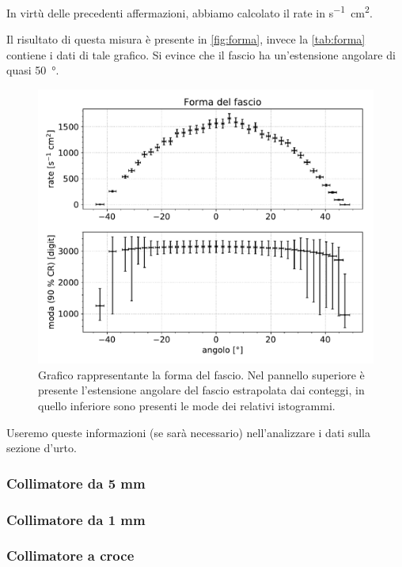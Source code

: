 
In virtù delle precedenti affermazioni, abbiamo calcolato il rate in \si{s^{-1}cm^2}.



Il risultato di questa misura è presente in \autoref{fig:forma}, invece la \autoref{tab:forma} contiene i dati di tale grafico.
Si evince che il fascio ha un'estensione angolare di quasi \SI{50}{\degree}. 

\begin{figure}[h]
\centering
\includegraphics[width=30 em]{immagini/forma}
\caption{Grafico rappresentante la forma del fascio. Nel pannello superiore è presente l'estensione angolare del fascio estrapolata dai conteggi, in quello inferiore sono presenti le mode dei relativi istogrammi.}
\label{fig:forma}
\end{figure}

Useremo queste informazioni (se sarà necessario) nell'analizzare i dati sulla sezione d'urto.

\subsubsection{Collimatore da 5\! mm}

\subsubsection{Collimatore da 1\! mm}

\subsubsection{Collimatore a croce}